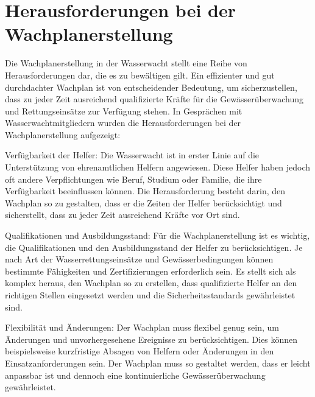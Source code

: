 \documentclass[fontsize=12pt,openright,oneside,paper=a4,BCOR=1cm]{scrbook}
\begin{document}

\section{Herausforderungen bei der Wachplanerstellung}

Die Wachplanerstellung in der Wasserwacht stellt eine Reihe von Herausforderungen dar, die es zu bewältigen gilt. Ein effizienter und gut durchdachter Wachplan ist von entscheidender Bedeutung, um sicherzustellen, dass zu jeder Zeit ausreichend qualifizierte Kräfte für die Gewässerüberwachung und Rettungseinsätze zur Verfügung stehen. In Gesprächen mit Wasserwachtmitgliedern wurden die Herausforderungen bei der Wachplanerstellung aufgezeigt:

Verfügbarkeit der Helfer: Die Wasserwacht ist in erster Linie auf die Unterstützung von ehrenamtlichen Helfern angewiesen. Diese Helfer haben jedoch oft andere Verpflichtungen wie Beruf, Studium oder Familie, die ihre Verfügbarkeit beeinflussen können. Die Herausforderung besteht darin, den Wachplan so zu gestalten, dass er die Zeiten der Helfer berücksichtigt und sicherstellt, dass zu jeder Zeit ausreichend Kräfte vor Ort sind.

Qualifikationen und Ausbildungsstand: Für die Wachplanerstellung ist es wichtig, die Qualifikationen und den Ausbildungsstand der Helfer zu berücksichtigen. Je nach Art der Wasserrettungseinsätze und Gewässerbedingungen können bestimmte Fähigkeiten und Zertifizierungen erforderlich sein. Es stellt sich als komplex heraus, den Wachplan so zu erstellen, dass qualifizierte Helfer an den richtigen Stellen eingesetzt werden und die Sicherheitsstandards gewährleistet sind.

Flexibilität und Änderungen: Der Wachplan muss flexibel genug sein, um Änderungen und unvorhergesehene Ereignisse zu berücksichtigen. Dies können beispielsweise kurzfristige Absagen von Helfern oder Änderungen in den Einsatzanforderungen sein. Der Wachplan muss so gestaltet werden, dass er leicht anpassbar ist und dennoch eine kontinuierliche Gewässerüberwachung gewährleistet.
\end{document}
